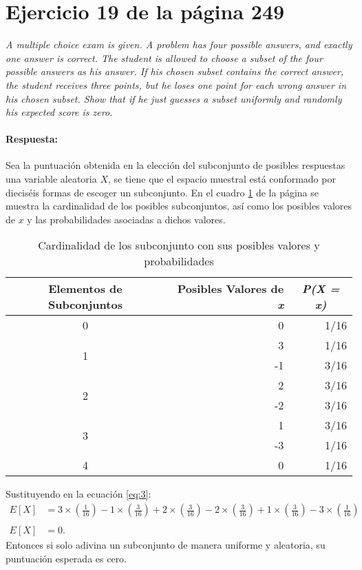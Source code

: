 \documentclass{article}
\begin{document}
\section{Ejercicio 19 de la página 249}  
\emph{A multiple choice exam is given. A problem has four possible answers, and exactly one answer is correct. The student is allowed to choose a subset of the four possible answers as his answer. If his chosen subset contains the correct answer, the student receives three points, but he loses one point for each wrong answer in his chosen subset. Show that if he just guesses a subset uniformly and randomly his expected score is zero.}

\paragraph{Respuesta:} Sea la puntuación obtenida en la elección del subconjunto de posibles respuestas una variable aleatoria $X$, se tiene que el espacio muestral está conformado por dieciséis formas de escoger un subconjunto.  En el cuadro \ref{tab:6} de la página \pageref{tab:6} se muestra la cardinalidad de los posibles subconjuntos, así como los posibles valores de $x$ y las probabilidades asociadas a dichos valores.
\begin{table}[H]
  \centering
  \caption{Cardinalidad de los subconjunto con  sus posibles valores y probabilidades}
    \begin{tabular}{crr}
    \toprule
    \multicolumn{1}{p{7em}}{\textbf{Elementos de Subconjuntos}} & \multicolumn{1}{p{5.39em}}{\textbf{Posibles Valores de \textit{\textbf{x}}}} & \multicolumn{1}{c}{\textit{\textbf{P(X = x)}}} \\
    \midrule
    0     & 0     & 1/16 \\
    \midrule
    \multirow{2}[2]{*}{1} & 3     & 1/16 \\
          & -1    & 3/16 \\
    \midrule
    \multirow{2}[2]{*}{2} & 2     & 3/16 \\
          & -2    & 3/16 \\
    \midrule
    \multirow{2}[2]{*}{3} & 1     & 3/16 \\
          & -3    & 1/16 \\
    \midrule
    4     & 0     & 1/16 \\
    \bottomrule
    \end{tabular}%
  \label{tab:6}%
\end{table}%

Sustituyendo en la ecuación \ref{eq:3}:
\begin{equation}
\begin{array}{ll}
   E[X] &= 3\times \left(\frac{1}{16}\right) - 1\times \left(\frac{3}{16}\right)+ 2\times \left(\frac{3}{16}\right)- 2\times \left(\frac{3}{16}\right)+ 1\times \left(\frac{3}{16}\right)- 3\times \left(\frac{1}{16}\right) \\
   &\\
   E[X] & = 0. 
  
   \end{array}
   \end{equation}
    Entonces si solo adivina un subconjunto de manera uniforme y aleatoria, su puntuación esperada es cero.
\end{document}
